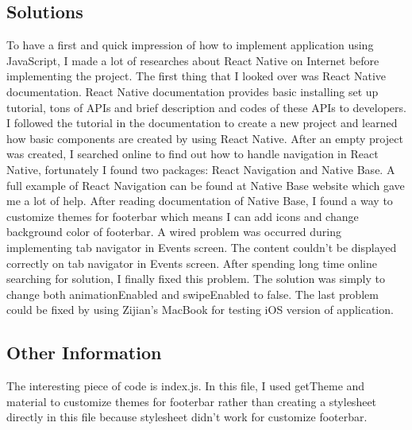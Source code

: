 \documentclass[letterpaper, 10pt,titlepage]{article}
\begin{document}
\subsection{Solutions}
To have a first and quick impression of how to implement application using JavaScript, I made a lot of researches about React Native on Internet before implementing the project. The first thing that I looked over was React Native documentation. React Native documentation provides basic installing set up tutorial, tons of APIs and brief description and codes of these APIs to developers. I followed the tutorial in the documentation to create a new project and learned how basic components are created by using React Native. After an empty project was created, I searched online to find out how to handle navigation in React Native, fortunately I found two packages: React Navigation and Native Base. A full example of React Navigation can be found at Native Base website which gave me a lot of help. After reading documentation of Native Base, I found a way to customize themes for footerbar which means I can add icons and change background color of footerbar. A wired problem was occurred during implementing tab navigator in Events screen. The content couldn’t be displayed correctly on tab navigator in Events screen. After spending long time online searching for solution, I finally fixed this problem. The solution was simply to change both animationEnabled and swipeEnabled to false. The last problem could be fixed by using Zijian’s MacBook for testing iOS version of application. 

\subsection{Other Information}
The interesting piece of code is index.js. In this file, I used getTheme and material to customize themes for footerbar rather than creating a stylesheet directly in this file because stylesheet didn’t work for customize footerbar.
\end{document}
